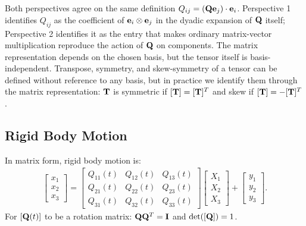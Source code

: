 \documentclass[
  letterpaper,
  DIV=11,
  numbers=noendperiod]{scrreprt}
\newcommand{\lp}{\left(}
\newcommand{\rp}{\right)}
\begin{document}
\begin{tcolorbox}[enhanced jigsaw, arc=.35mm, bottomrule=.15mm, bottomtitle=1mm, breakable, colback=white, colbacktitle=quarto-callout-important-color!10!white, colframe=quarto-callout-important-color-frame, coltitle=black, left=2mm, leftrule=.75mm, opacityback=0, opacitybacktitle=0.6, rightrule=.15mm, title=\textcolor{quarto-callout-important-color}{\faExclamation}\hspace{0.5em}{Note!}, titlerule=0mm, toprule=.15mm, toptitle=1mm]

Both perspectives agree on the same definition
\(Q_{ij}=\lp{\bf Q}{\bf e}_j\rp\cdot{\bf e}_i\). Perspective 1
identifies \(Q_{ij}\) as the coefficient of
\({\bf e}_i\otimes{\bf e}_j\) in the dyadic expansion of \({\bf Q}\)
itself; Perspective 2 identifies it as the entry that makes ordinary
matrix-vector multiplication reproduce the action of \({\bf Q}\) on
components. The matrix representation depends on the chosen basis, but
the tensor itself is basis-independent. Transpose, symmetry, and
skew-symmetry of a tensor can be defined without reference to any basis,
but in practice we identify them through the matrix representation:
\({\bf T}\) is symmetric if \([{\bf T}]=[{\bf T}]^T\) and skew if
\([{\bf T}]=-[{\bf T}]^T\).

\end{tcolorbox}

\subsection{Rigid Body Motion}\label{rigid-body-motion}

In matrix form, rigid body motion is: \begin{align}
    \begin{bmatrix}x_1\\x_2\\x_3\end{bmatrix}
    =
    \begin{bmatrix}Q_{11}(t)&Q_{12}(t)&Q_{13}(t)\\Q_{21}(t)&Q_{22}(t)&Q_{23}(t)\\Q_{31}(t)&Q_{32}(t)&Q_{33}(t)\end{bmatrix}
    \begin{bmatrix}X_1\\X_2\\X_3\end{bmatrix}
    +
    \begin{bmatrix}y_1\\y_2\\y_3\end{bmatrix}.
\end{align} For \([{\bf Q}(t)]\) to be a rotation matrix:
\({\bf Q}{\bf Q}^T = {\bf I}\) and \(\det([{\bf Q}]) = 1\).
\end{document}
